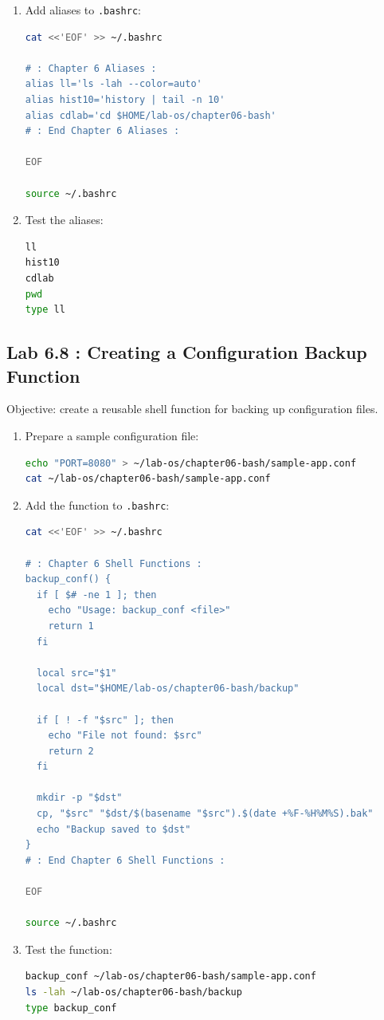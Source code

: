 \begin{enumerate}
  \item Add aliases to \texttt{.bashrc}:
\begin{lstlisting}[language=bash, caption={Adding aliases to .bashrc}]
cat <<'EOF' >> ~/.bashrc

# : Chapter 6 Aliases :
alias ll='ls -lah --color=auto'
alias hist10='history | tail -n 10'
alias cdlab='cd $HOME/lab-os/chapter06-bash'
# : End Chapter 6 Aliases :

EOF

source ~/.bashrc
\end{lstlisting}

  \item Test the aliases:
\begin{lstlisting}[language=bash, caption={Testing the aliases}]
ll
hist10
cdlab
pwd
type ll
\end{lstlisting}
\end{enumerate}

\subsection*{Lab 6.8 : Creating a Configuration Backup Function}

Objective: create a reusable shell function for backing up configuration
files.

\begin{enumerate}
  \item Prepare a sample configuration file:
\begin{lstlisting}[language=bash, caption={Creating a sample configuration file}]
echo "PORT=8080" > ~/lab-os/chapter06-bash/sample-app.conf
cat ~/lab-os/chapter06-bash/sample-app.conf
\end{lstlisting}

  \item Add the function to \texttt{.bashrc}:
\begin{lstlisting}[language=bash, caption={Adding the backup\_conf function to .bashrc}]
cat <<'EOF' >> ~/.bashrc

# : Chapter 6 Shell Functions :
backup_conf() {
  if [ $# -ne 1 ]; then
    echo "Usage: backup_conf <file>"
    return 1
  fi

  local src="$1"
  local dst="$HOME/lab-os/chapter06-bash/backup"

  if [ ! -f "$src" ]; then
    echo "File not found: $src"
    return 2
  fi

  mkdir -p "$dst"
  cp, "$src" "$dst/$(basename "$src").$(date +%F-%H%M%S).bak"
  echo "Backup saved to $dst"
}
# : End Chapter 6 Shell Functions :

EOF

source ~/.bashrc
\end{lstlisting}

  \item Test the function:
\begin{lstlisting}[language=bash, caption={Testing the backup\_conf function}]
backup_conf ~/lab-os/chapter06-bash/sample-app.conf
ls -lah ~/lab-os/chapter06-bash/backup
type backup_conf
\end{lstlisting}
\end{enumerate}

